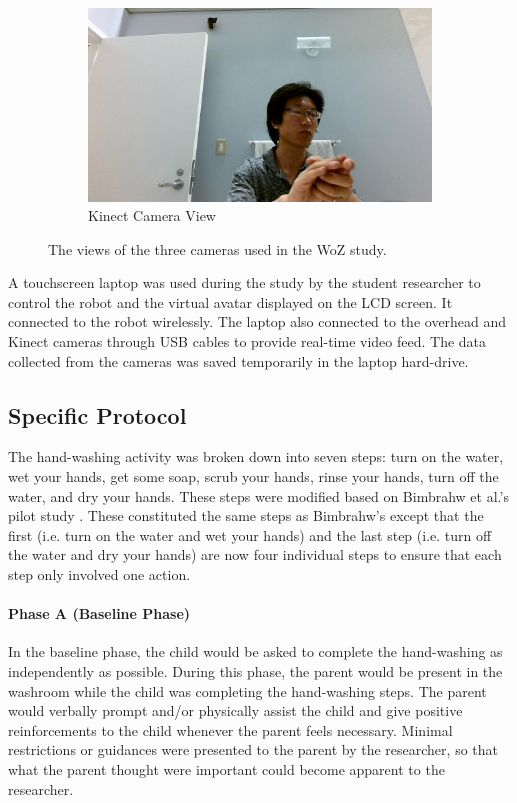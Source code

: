 \begin{figure}[H]
	
	\begin{subfigure}[b]{0.49\textwidth}
		\includegraphics[width=1.1\linewidth]{./img/kinect_view}
		\caption{Kinect Camera View}
	\end{subfigure}%
	
	\caption{The views of the three cameras used in the WoZ study.}
	\label{fig:CameraViews}
\end{figure}


A touchscreen laptop was used during the study by the student researcher to control the robot and the virtual avatar displayed on the LCD screen. It connected to the robot wirelessly. The laptop also connected to the overhead and Kinect cameras through USB cables to provide real-time video feed. The data collected from the cameras was saved temporarily in the laptop hard-drive.

\subsection{Specific Protocol}
\label{sec:SpecificProtocol}
The hand-washing activity was broken down into seven steps: turn on the water, wet your hands, get some soap, scrub your hands, rinse your hands, turn off the water, and dry your hands.  These steps were modified based on Bimbrahw et al.'s pilot study \cite{bimbrahw2012investigating}. These constituted the same steps as Bimbrahw's except that the first (i.e. turn on the water and wet your hands) and the last step (i.e. turn off the water and dry your hands) are now four individual steps to ensure that each step only involved one action.

\paragraph{Phase A (Baseline Phase)}
In the baseline phase, the child would be asked to complete the hand-washing as independently as possible. During this phase, the parent would be present in the washroom while the child was completing the hand-washing steps. The parent would verbally prompt and/or physically assist the child and give positive reinforcements to the child whenever the parent feels necessary.  Minimal restrictions or guidances were presented to the parent by the researcher, so that what the parent thought were important could become apparent to the researcher.

